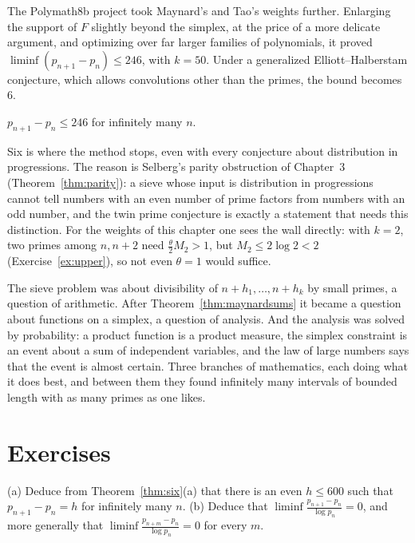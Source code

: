 The Polymath8b project took Maynard's and Tao's weights further. Enlarging the support of $F$ slightly beyond the simplex, at the price of a more delicate argument, and optimizing over far larger families of polynomials, it proved $\liminf(p_{n+1}-p_n)\le246$, with $k=50$. Under a generalized Elliott--Halberstam conjecture, which allows convolutions other than the primes, the bound becomes $6$.

\begin{theorem}\label{thm:246}
$p_{n+1}-p_n\le246$ for infinitely many $n$.
\end{theorem}

Six is where the method stops, even with every conjecture about distribution in progressions. The reason is Selberg's parity obstruction of Chapter~3 (Theorem~\ref{thm:parity}): a sieve whose input is distribution in progressions cannot tell numbers with an even number of prime factors from numbers with an odd number, and the twin prime conjecture is exactly a statement that needs this distinction. For the weights of this chapter one sees the wall directly: with $k=2$, two primes among $n,n+2$ need $\frac\theta2M_2>1$, but $M_2\le2\log2<2$ (Exercise~\ref{ex:upper}), so not even $\theta=1$ would suffice.

\begin{beauty}
The sieve problem was about divisibility of $n+h_1,\dots,n+h_k$ by small primes, a question of arithmetic. After Theorem~\ref{thm:maynardsums} it became a question about functions on a simplex, a question of analysis. And the analysis was solved by probability: a product function is a product measure, the simplex constraint is an event about a sum of independent variables, and the law of large numbers says that the event is almost certain. Three branches of mathematics, each doing what it does best, and between them they found infinitely many intervals of bounded length with as many primes as one likes.
\end{beauty}

\section{Exercises}

\begin{exercise}[$\star$]\label{ex:pigeon}
(a) Deduce from Theorem~\ref{thm:six}(a) that there is an even $h\le600$ such that $p_{n+1}-p_n=h$ for infinitely many $n$.
(b) Deduce that $\liminf\frac{p_{n+1}-p_n}{\log p_n}=0$, and more generally that $\liminf\frac{p_{n+m}-p_n}{\log p_n}=0$ for every $m$.
\end{exercise}

